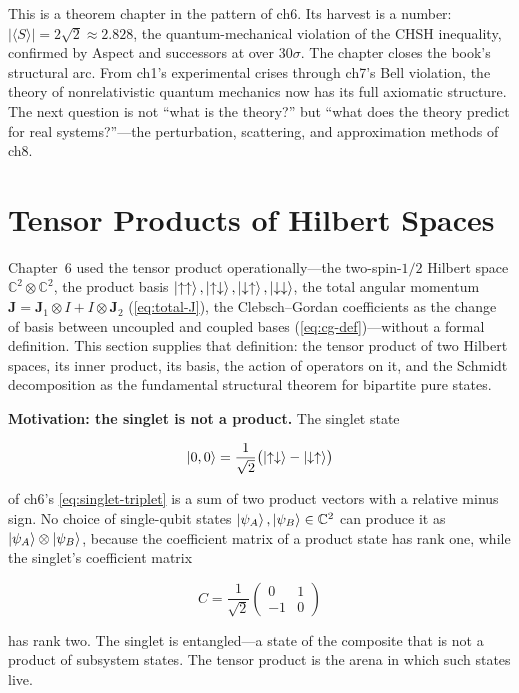 This is a theorem chapter in the pattern of ch6. Its harvest is a number: $\lvert\langle S\rangle\rvert = 2\sqrt{2} \approx 2.828$, the quantum-mechanical violation of the CHSH inequality, confirmed by Aspect and successors at over $30\sigma$. The chapter closes the book's structural arc. From ch1's experimental crises through ch7's Bell violation, the theory of nonrelativistic quantum mechanics now has its full axiomatic structure. The next question is not ``what is the theory?'' but ``what does the theory predict for real systems?''---the perturbation, scattering, and approximation methods of ch8.
\section{Tensor Products of Hilbert Spaces}
\label{sec:tensor-products}

Chapter~6 used the tensor product operationally---the two-spin-$1/2$ Hilbert space $\mathbb{C}^2 \otimes \mathbb{C}^2$, the product basis $\ket{\uparrow\uparrow}, \ket{\uparrow\downarrow}, \ket{\downarrow\uparrow}, \ket{\downarrow\downarrow}$, the total angular momentum $\bm J = \bm J_1 \otimes I + I \otimes \bm J_2$ (\eqref{eq:total-J}), the Clebsch--Gordan coefficients as the change of basis between uncoupled and coupled bases (\eqref{eq:cg-def})---without a formal definition. This section supplies that definition: the tensor product of two Hilbert spaces, its inner product, its basis, the action of operators on it, and the Schmidt decomposition as the fundamental structural theorem for bipartite pure states.

\medskip\noindent\textbf{Motivation: the singlet is not a product.}
The singlet state
\begin{linenomath}
\begin{equation}
\ket{0,0} = \frac{1}{\sqrt{2}}\bigl(\ket{\uparrow\downarrow} - \ket{\downarrow\uparrow}\bigr)
\end{equation}
\end{linenomath}
of ch6's \eqref{eq:singlet-triplet} is a sum of two product vectors with a relative minus sign. No choice of single-qubit states $\ket{\psi_A}, \ket{\psi_B} \in \mathbb{C}^2$ can produce it as $\ket{\psi_A} \otimes \ket{\psi_B}$, because the coefficient matrix of a product state has rank one, while the singlet's coefficient matrix
\begin{linenomath}
\begin{equation}
C = \frac{1}{\sqrt{2}}
\begin{pmatrix}
0 & 1 \\
-1 & 0
\end{pmatrix}
\end{equation}
\end{linenomath}
has rank two. The singlet is entangled---a state of the composite that is not a product of subsystem states. The tensor product is the arena in which such states live.

